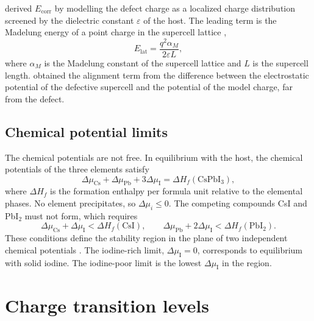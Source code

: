 \citet{Freysoldt2009} derived $E_\mathrm{corr}$ by modelling the defect charge as a localized charge distribution screened by the dielectric constant $\varepsilon$ of the host. The leading term is the Madelung energy of a point charge in the supercell lattice \citep{Makov1995},
\begin{equation*}
  E_\mathrm{lat} = \frac{q^2 \alpha_M}{2 \varepsilon L} ,
\end{equation*}
where $\alpha_M$ is the Madelung constant of the supercell lattice and $L$ is the supercell length. \citet{Freysoldt2009} obtained the alignment term from the difference between the electrostatic potential of the defective supercell and the potential of the model charge, far from the defect.

\subsection{Chemical potential limits}

The chemical potentials are not free. In equilibrium with the host, the chemical potentials of the three elements satisfy
\begin{equation*}
  \Delta\mu_\mathrm{Cs} + \Delta\mu_\mathrm{Pb} + 3\Delta\mu_\mathrm{I} = \Delta H_f(\mathrm{CsPbI_3}) ,
\end{equation*}
where $\Delta H_f$ is the formation enthalpy per formula unit relative to the elemental phases. No element precipitates, so $\Delta\mu_i \le 0$. The competing compounds CsI and PbI$_2$ must not form, which requires
\begin{equation*}
  \Delta\mu_\mathrm{Cs} + \Delta\mu_\mathrm{I} < \Delta H_f(\mathrm{CsI}), \qquad \Delta\mu_\mathrm{Pb} + 2\Delta\mu_\mathrm{I} < \Delta H_f(\mathrm{PbI_2}) .
\end{equation*}
These conditions define the stability region in the plane of two independent chemical potentials \citep{Zhang1991,Xu2017}. The iodine-rich limit, $\Delta\mu_\mathrm{I} = 0$, corresponds to equilibrium with solid iodine. The iodine-poor limit is the lowest $\Delta\mu_\mathrm{I}$ in the region.

\section{Charge transition levels}
\label{sec:transition-theory}

